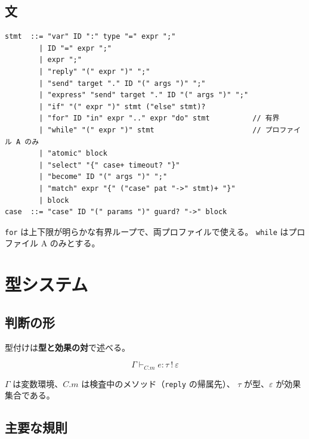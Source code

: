 \documentclass[11pt,a4paper]{ltjsarticle}
\theoremstyle{remark}
\begin{document}
\subsection{文}

\begin{lstlisting}[language={}]
stmt  ::= "var" ID ":" type "=" expr ";"
        | ID "=" expr ";"
        | expr ";"
        | "reply" "(" expr ")" ";"
        | "send" target "." ID "(" args ")" ";"
        | "express" "send" target "." ID "(" args ")" ";"
        | "if" "(" expr ")" stmt ("else" stmt)?
        | "for" ID "in" expr ".." expr "do" stmt          // 有界
        | "while" "(" expr ")" stmt                       // プロファイル A のみ
        | "atomic" block
        | "select" "{" case+ timeout? "}"
        | "become" ID "(" args ")" ";"
        | "match" expr "{" ("case" pat "->" stmt)+ "}"
        | block
case  ::= "case" ID "(" params ")" guard? "->" block
\end{lstlisting}

\texttt{for} は上下限が明らかな有界ループで、両プロファイルで使える。
\texttt{while} はプロファイル A のみとする。

\section{型システム}

\subsection{判断の形}

型付けは\textbf{型と効果の対}で述べる。

\[
\Gamma \vdash_{C.m} e : \tau\ !\ \varepsilon
\]

$\Gamma$ は変数環境、$C.m$ は検査中のメソッド（\texttt{reply} の帰属先）、
$\tau$ が型、$\varepsilon$ が効果集合である。

\subsection{主要な規則}
\end{document}
